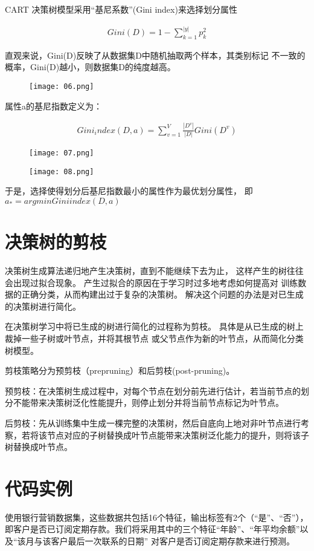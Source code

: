 \documentclass[12pt]{article}
\begin{document}
CART 决策树模型采用“基尼系数”(Gini index)来选择划分属性

\begin{align}
	Gini(D)=1-\sum_{k = 1}^{|y|}p_k^2  
\end{align}

直观来说，Gini(D)反映了从数据集D中随机抽取两个样本，其类别标记
不一致的概率，Gini(D)越小，则数据集D的纯度越高。
\begin{figure}[htbp]
	\centering
	\texttt{[image: 06.png]}
\end{figure}

属性a的基尼指数定义为：

\begin{align}
	Gini_index(D,a)=\sum_{v=1}^{V}\frac{|D^v|}{|D|}Gini(D^v)
\end{align}

\begin{figure}[htbp]
	\centering
	\texttt{[image: 07.png]}
\end{figure}
\begin{figure}[htbp]
	\centering
	\texttt{[image: 08.png]}
\end{figure}

于是，选择使得划分后基尼指数最小的属性作为最优划分属性，
即$a_\ast =arg min Giniindex(D,a)$

\section{决策树的剪枝}
决策树生成算法递归地产生决策树，直到不能继续下去为止，
这样产生的树往往会出现过拟合现象。
产生过拟合的原因在于学习时过多地考虑如何提高对
训练数据的正确分类，从而构建出过于复杂的决策树。
解决这个问题的办法是对已生成的决策树进行简化。

在决策树学习中将已生成的树进行简化的过程称为剪枝。
具体是从已生成的树上裁掉一些子树或叶节点，并将其根节点
或父节点作为新的叶节点，从而简化分类树模型。


剪枝策略分为预剪枝（prepruning）和后剪枝(post-pruning)。

预剪枝：在决策树生成过程中，对每个节点在划分前先进行估计，若当前节点的划分不能带来决策树泛化性能提升，则停止划分并将当前节点标记为叶节点。

后剪枝：先从训练集中生成一棵完整的决策树，然后自底向上地对非叶节点进行考察，若将该节点对应的子树替换成叶节点能带来决策树泛化能力的提升，则将该子树替换成叶节点。


\newpage

\section{代码实例}
使用银行营销数据集，这些数据共包括16个特征，输出标签有2个（“是”、“否”），即客户是否已订阅定期存款。我们将采用其中的三个特征“年龄”、“年平均余额”以及“该月与该客户最后一次联系的日期”
对客户是否订阅定期存款来进行预测。
\end{document}
